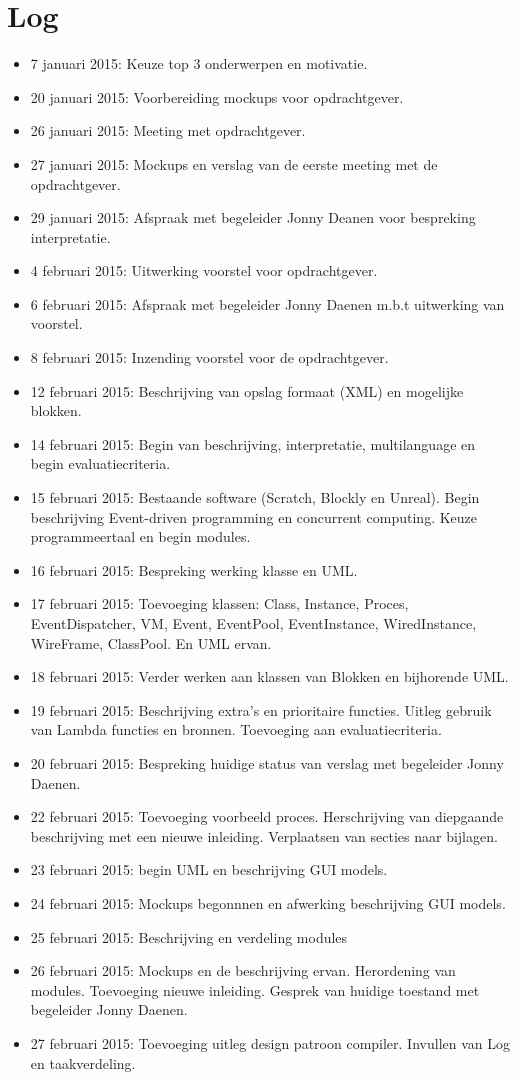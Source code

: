 \documentclass[]{article}
\begin{document}
\section{Log}
\begin{itemize}
\item 7 januari 2015: Keuze top 3 onderwerpen en motivatie.
\item 20 januari 2015: Voorbereiding mockups voor opdrachtgever.
\item 26 januari 2015: Meeting met opdrachtgever.
\item 27 januari 2015: Mockups en verslag van de eerste meeting met de opdrachtgever.
\item 29 januari 2015: Afspraak met begeleider Jonny Deanen voor bespreking interpretatie.
\item 4 februari 2015: Uitwerking voorstel voor opdrachtgever.
\item 6 februari 2015: Afspraak met begeleider Jonny Daenen m.b.t uitwerking van voorstel.
\item 8 februari 2015: Inzending voorstel voor de opdrachtgever.
\item 12 februari 2015: Beschrijving van opslag formaat (XML) en mogelijke blokken.
\item 14 februari 2015: Begin van beschrijving, interpretatie, multilanguage en begin evaluatiecriteria.
\item 15 februari 2015: Bestaande software (Scratch, Blockly en Unreal). Begin beschrijving Event-driven programming en concurrent computing. Keuze programmeertaal en begin modules.
\item 16 februari 2015: Bespreking werking klasse en UML.
\item 17 februari 2015:  Toevoeging klassen: Class, Instance, Proces, EventDispatcher, VM, Event, EventPool, EventInstance, WiredInstance, WireFrame, ClassPool. En UML ervan.
\item 18 februari 2015: Verder werken aan klassen van Blokken en bijhorende UML.
\item 19 februari 2015: Beschrijving extra's en prioritaire functies. Uitleg gebruik van Lambda functies en bronnen. Toevoeging aan evaluatiecriteria.
\item 20 februari 2015: Bespreking huidige status van verslag met begeleider Jonny Daenen.
\item 22 februari 2015: Toevoeging voorbeeld proces. Herschrijving van diepgaande beschrijving met een nieuwe inleiding. Verplaatsen van secties naar bijlagen.
\item 23 februari 2015: begin UML en beschrijving GUI models.
\item 24 februari 2015: Mockups begonnnen en afwerking beschrijving GUI models.
\item 25 februari 2015: Beschrijving en verdeling modules
\item 26 februari 2015: Mockups en de beschrijving ervan. Herordening van modules. Toevoeging nieuwe inleiding. Gesprek van huidige toestand met begeleider Jonny Daenen.
\item 27 februari 2015: Toevoeging uitleg design patroon compiler. Invullen van Log en taakverdeling.


\end{itemize}
\end{document}
